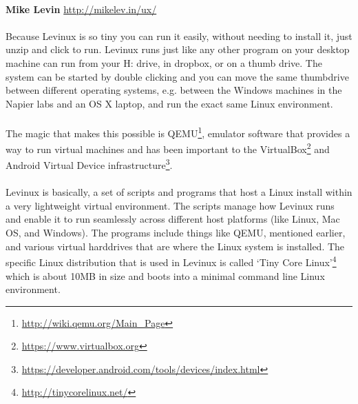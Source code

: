 \documentclass[12pt, a4paper, twoside]{book}
\begin{document}
\\
{\bf Mike Levin} \hfill \url{http://mikelev.in/ux/}

\paragraph{} Because Levinux is so tiny you can run it easily, without needing to install it, just unzip and click to run. Levinux runs just like any other program on your desktop machine can run from your H: drive, in dropbox, or on a thumb drive. The system can be started by double clicking and you can move the same thumbdrive between different operating systems, e.g. between the Windows machines in the Napier labs and an OS X laptop, and run the exact same Linux environment.

\paragraph{} The magic that makes this possible is QEMU\footnote{\url{http://wiki.qemu.org/Main_Page}}, emulator software that provides a way to run virtual machines and has been important to the VirtualBox\footnote{\url{https://www.virtualbox.org}} and Android Virtual Device infrastructure\footnote{\url{https://developer.android.com/tools/devices/index.html}}.

\paragraph{} Levinux is basically, a set of scripts and programs that host a Linux install within a very lightweight virtual environment. The scripts manage how Levinux runs and enable it to run seamlessly across different host platforms (like Linux, Mac OS, and Windows). The programs include things like QEMU, mentioned earlier, and various virtual harddrives that are where the Linux system is installed. The specific Linux distribution that is used in Levinux is called `Tiny Core Linux'\footnote{\url{http://tinycorelinux.net/}} which is about 10MB in size and boots into a minimal command line Linux environment.
\end{document}
